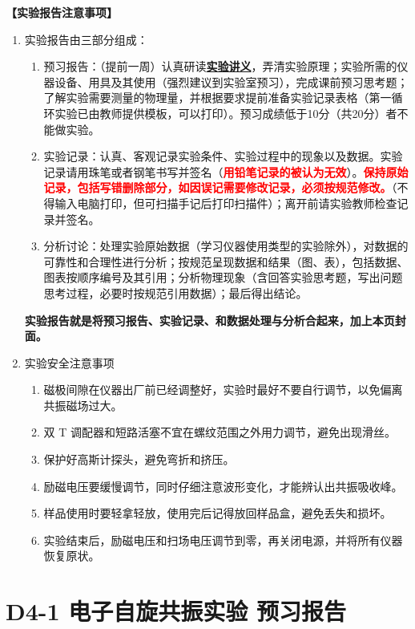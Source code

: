 \documentclass[dvipsnames, svgnames,a4paper,11pt]{article}
\begin{document}
\textbf{【实验报告注意事项】}
\begin{enumerate}
	\item 实验报告由三部分组成：
	\begin{enumerate}
		\item 预习报告：（提前一周）认真研读\underline{\textbf{实验讲义}}，弄清实验原理；实验所需的仪器设备、用具及其使用（强烈建议到实验室预习），完成课前预习思考题；了解实验需要测量的物理量，并根据要求提前准备实验记录表格（第一循环实验已由教师提供模板，可以打印）。预习成绩低于10分（共20分）者不能做实验。
	    \item 实验记录：认真、客观记录实验条件、实验过程中的现象以及数据。实验记录请用珠笔或者钢笔书写并签名（\textcolor{red}{\textbf{用铅笔记录的被认为无效}}）。\textcolor{red}{\textbf{保持原始记录，包括写错删除部分，如因误记需要修改记录，必须按规范修改。}}（不得输入电脑打印，但可扫描手记后打印扫描件）；离开前请实验教师检查记录并签名。
	    \item 分析讨论：处理实验原始数据（学习仪器使用类型的实验除外），对数据的可靠性和合理性进行分析；按规范呈现数据和结果（图、表），包括数据、图表按顺序编号及其引用；分析物理现象（含回答实验思考题，写出问题思考过程，必要时按规范引用数据）；最后得出结论。
	\end{enumerate}
	\textbf{实验报告就是将预习报告、实验记录、和数据处理与分析合起来，加上本页封面。}
	\item 实验安全注意事项
		\begin{enumerate}[label=\roman*.]
			\item 磁极间隙在仪器出厂前已经调整好，实验时最好不要自行调节，以免偏离共振磁场过大。
			\item 双 T 调配器和短路活塞不宜在螺纹范围之外用力调节，避免出现滑丝。
			\item 保护好高斯计探头，避免弯折和挤压。
			\item 励磁电压要缓慢调节，同时仔细注意波形变化，才能辨认出共振吸收峰。
			\item 样品使用时要轻拿轻放，使用完后记得放回样品盒，避免丢失和损坏。
			\item 实验结束后，励磁电压和扫场电压调节到零，再关闭电源，并将所有仪器恢复原状。
		\end{enumerate}
\end{enumerate}


\clearpage
\tableofcontents
\clearpage

\setcounter{section}{0}
\section{D4-1 \quad 电子自旋共振实验 \quad\heiti 预习报告}
	
\end{document}
